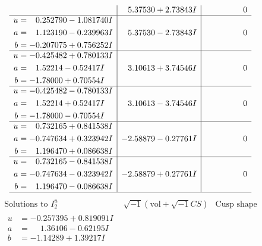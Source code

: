 \documentclass[1p]{elsarticle_modified}
\theoremstyle{definition}
\newcommand{\I}{\sqrt{-1}}
\begin{document}
$$\begin{array}{c|c|c}
 & \phantom{-}5.37530 + 2.73843 I & \phantom{-0.000000 } 0 \\ \hline\begin{aligned}
u &= \phantom{-}0.252790 - 1.081740 I \\
a &= \phantom{-}1.123190 - 0.239963 I \\
b &= -0.207075 + 0.756252 I\end{aligned}
 & \phantom{-}5.37530 - 2.73843 I & \phantom{-0.000000 } 0 \\ \hline\begin{aligned}
u &= -0.425482 + 0.780133 I \\
a &= \phantom{-}1.52214 - 0.52417 I \\
b &= -1.78000 + 0.70554 I\end{aligned}
 & \phantom{-}3.10613 + 3.74546 I & \phantom{-0.000000 } 0 \\ \hline\begin{aligned}
u &= -0.425482 - 0.780133 I \\
a &= \phantom{-}1.52214 + 0.52417 I \\
b &= -1.78000 - 0.70554 I\end{aligned}
 & \phantom{-}3.10613 - 3.74546 I & \phantom{-0.000000 } 0 \\ \hline\begin{aligned}
u &= \phantom{-}0.732165 + 0.841538 I \\
a &= -0.747634 + 0.323942 I \\
b &= \phantom{-}1.196470 + 0.086638 I\end{aligned}
 & -2.58879 - 0.27761 I & \phantom{-0.000000 } 0 \\ \hline\begin{aligned}
u &= \phantom{-}0.732165 - 0.841538 I \\
a &= -0.747634 - 0.323942 I \\
b &= \phantom{-}1.196470 - 0.086638 I\end{aligned}
 & -2.58879 + 0.27761 I & \phantom{-0.000000 } 0\\
 \hline 
 \end{array}$$\newpage$$\begin{array}{c|c|c}  
\text{Solutions to }I^u_{2}& \I (\text{vol} + \sqrt{-1}CS) & \text{Cusp shape}\\
 \hline 
\begin{aligned}
u &= -0.257395 + 0.819091 I \\
a &= \phantom{-}1.36106 - 0.62195 I \\
b &= -1.14289 + 1.39217 I\end{aligned}

\end{array}$$
\end{document}
